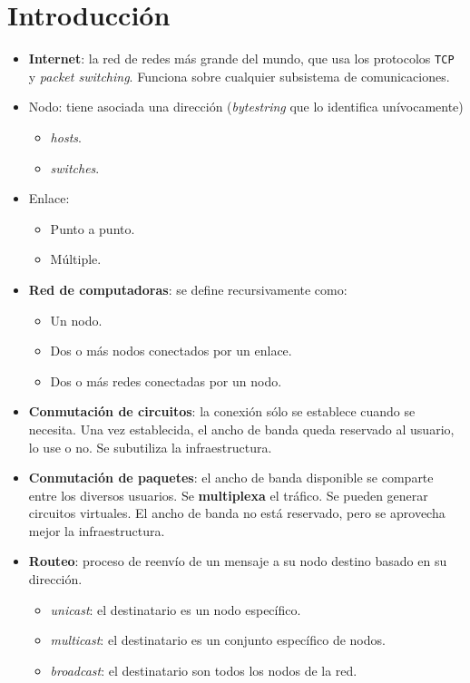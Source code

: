 \documentclass[]{article}
\begin{document}
\section{Introducción}
\begin{itemize}
	\item \textbf{Internet}: la red de redes más grande del mundo, que usa los protocolos \texttt{TCP} y \emph{packet switching}. Funciona sobre cualquier subsistema de comunicaciones.
	\item Nodo: tiene asociada una dirección (\emph{bytestring} que lo identifica unívocamente)
	\begin{itemize}
		\item \emph{hosts}.
		\item \emph{switches}.
	\end{itemize}
	\item Enlace:
	\begin{itemize}
		\item Punto a punto.
		\item Múltiple.
	\end{itemize}
	\item \textbf{Red de computadoras}: se define recursivamente como:
	\begin{itemize}
		\item Un nodo.
		\item Dos o más nodos conectados por un enlace.
		\item Dos o más redes conectadas por un nodo.
	\end{itemize}
	\item \textbf{Conmutación de circuitos}: la conexión sólo se establece cuando se necesita. Una vez establecida, el ancho de banda queda reservado al usuario, lo use o no. Se subutiliza la infraestructura.
	\item \textbf{Conmutación de paquetes}: el ancho de banda disponible se comparte entre los diversos usuarios. Se \textbf{multiplexa} el tráfico. Se pueden generar circuitos virtuales. El ancho de banda no está reservado, pero se aprovecha mejor la infraestructura.
	\item \textbf{Routeo}: proceso de reenvío de un mensaje a su nodo destino basado en su dirección.
	\begin{itemize}
		\item \emph{unicast}: el destinatario es un nodo específico.
		\item \emph{multicast}: el destinatario es un conjunto específico de nodos.
		\item \emph{broadcast}: el destinatario son todos los nodos de la red.

\end{itemize}
\end{itemize}
\end{document}
